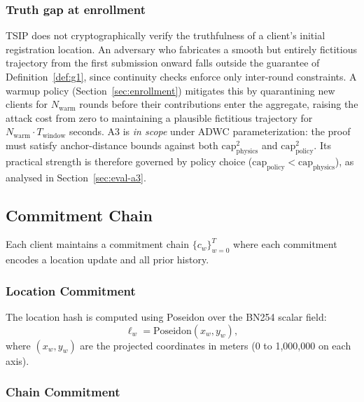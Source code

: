 \documentclass[conference]{IEEEtran}
\theoremstyle{definition}
\theoremstyle{plain}
\begin{document}
\subsubsection*{Truth gap at enrollment}
TSIP does not cryptographically verify the truthfulness of a
client's initial registration location.
An adversary who fabricates a smooth but entirely fictitious
trajectory from the first submission onward falls outside the
guarantee of Definition~\ref{def:g1}, since continuity checks
enforce only inter-round constraints.
A warmup policy (Section~\ref{sec:enrollment}) mitigates this
by quarantining new clients for $N_{\mathrm{warm}}$ rounds before
their contributions enter the aggregate, raising the attack cost
from zero to maintaining a plausible fictitious trajectory for
$N_{\mathrm{warm}} \cdot T_{\mathrm{window}}$ seconds.
A3 is \emph{in scope} under ADWC parameterization: the proof must satisfy
anchor-distance bounds against both
$\mathrm{cap}_{\mathrm{physics}}^2$ and
$\mathrm{cap}_{\mathrm{policy}}^2$.
Its practical strength is therefore governed by policy choice
($\mathrm{cap}_{\mathrm{policy}} < \mathrm{cap}_{\mathrm{physics}}$), as analysed
in Section~\ref{sec:eval-a3}.

\subsection{Commitment Chain}\label{sec:commitment}

Each client maintains a commitment chain $\{c_w\}_{w=0}^{T}$ where each commitment encodes a location update and all prior history.

\subsubsection{Location Commitment}

The location hash is computed using Poseidon over the BN254 scalar field:
\begin{equation}
\ell_w = \mathrm{Poseidon}(x_w, y_w),
\end{equation}
where $(x_w, y_w)$ are the projected coordinates in meters (0 to 1,000,000 on each axis).

\subsubsection{Chain Commitment}
\end{document}

